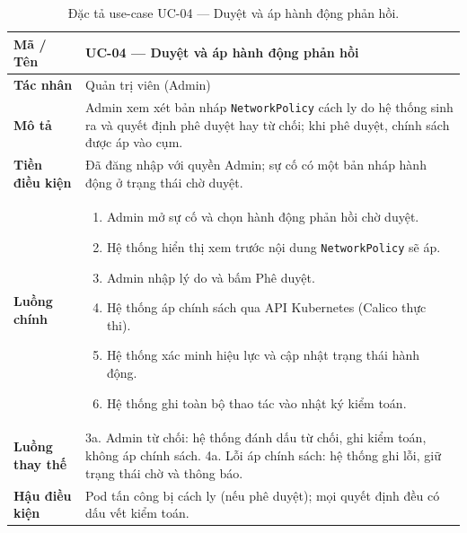 \begin{table}[H]
  \centering
  \caption{Đặc tả use-case UC-04 --- Duyệt và áp hành động phản hồi.}
  \label{tab:uc04}
  \small
  \begin{tabularx}{\linewidth}{@{}>{\bfseries}l X@{}}
    \toprule
    Mã / Tên & UC-04 --- Duyệt và áp hành động phản hồi \\
    \midrule
    Tác nhân & Quản trị viên (Admin) \\
    Mô tả & Admin xem xét bản nháp \texttt{NetworkPolicy} cách ly do hệ thống sinh ra và quyết định phê duyệt hay từ chối; khi phê duyệt, chính sách được áp vào cụm. \\
    Tiền điều kiện & Đã đăng nhập với quyền Admin; sự cố có một bản nháp hành động ở trạng thái chờ duyệt. \\
    Luồng chính &
      \begin{enumerate}[nosep,leftmargin=*]
        \item Admin mở sự cố và chọn hành động phản hồi chờ duyệt.
        \item Hệ thống hiển thị xem trước nội dung \texttt{NetworkPolicy} sẽ áp.
        \item Admin nhập lý do và bấm Phê duyệt.
        \item Hệ thống áp chính sách qua API Kubernetes (Calico thực thi).
        \item Hệ thống xác minh hiệu lực và cập nhật trạng thái hành động.
        \item Hệ thống ghi toàn bộ thao tác vào nhật ký kiểm toán.
      \end{enumerate} \\
    Luồng thay thế &
      3a. Admin từ chối: hệ thống đánh dấu từ chối, ghi kiểm toán, không áp chính sách.\newline
      4a. Lỗi áp chính sách: hệ thống ghi lỗi, giữ trạng thái chờ và thông báo. \\
    Hậu điều kiện & Pod tấn công bị cách ly (nếu phê duyệt); mọi quyết định đều có dấu vết kiểm toán. \\
    \bottomrule
  \end{tabularx}
\end{table}

